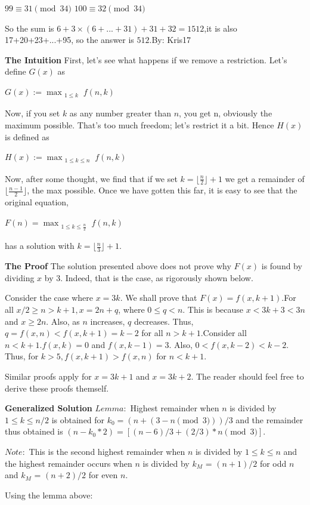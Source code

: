 \begin{enumerate}
 $99\equiv 31 \pmod{34}$
$100\equiv 32 \pmod{34}$

 So the sum is $6+3\times(6+...+31)+31+32=1512$,it is also 17+20+23+...+95, so the answer is $\boxed{512}$.By: Kris17

 \textbf{The Intuition} First, let's see what happens if we remove a restriction. Let's define $G(x)$ as

 $G(x):=\max_{\substack{1\le k}} f(n, k)$

 Now, if you set $k$ as any number greater than $n$, you get n, obviously the maximum possible. That's too much freedom; let's restrict it a bit. Hence $H(x)$ is defined as

 $H(x):=\max_{\substack{1\le k\le n}} f(n, k)$

 Now, after some thought, we find that if we set $k=\lfloor \frac{n}{2} \rfloor+1$ we get a remainder of $\lfloor \frac{n-1}{2} \rfloor$, the max possible. Once we have gotten this far, it is easy to see that the original equation, 

 $F(n) = \max_{\substack{1\le k\le \frac{n}{2}}} f(n, k)$

 has a solution with $k=\lfloor \frac{n}{3} \rfloor+1$.

 \textbf{The Proof} The solution presented above does not prove why $F(x)$ is found by dividing $x$ by $3$. Indeed, that is the case, as rigorously shown below.

 Consider the case where $x = 3k$. We shall prove that $F(x) = f(x, k+1)$.For all $x/2\ge n > k+1, x = 2n + q$, where $0\le q< n$. This is because $x < 3k + 3 < 3n$ and $x \ge 2n$. Also, as $n$ increases, $q$ decreases. Thus, $q = f(x, n) < f(x, k+1) = k - 2$ for all $n > k+1$.Consider all $n < k+1. f(x, k) = 0$ and $f(x, k-1) = 3$. Also, $0 < f(x, k-2) < k-2$. Thus, for $k > 5, f(x, k+1) > f(x, n)$ for $n < k+1$.

 Similar proofs apply for $x = 3k + 1$ and $x = 3k + 2$. The reader should feel free to derive these proofs themself.

 \textbf{Generalized Solution} $Lemma:$ Highest remainder when $n$ is divided by $1\leq k\leq n/2$ is obtained for $k_0 = (n + (3 - n \pmod{3}))/3$ and the remainder thus obtained is $(n - k_0*2) = [(n - 6)/3 + (2/3)*n \pmod{3}]$. 

 $Note:$ This is the second highest remainder when $n$ is divided by $1\leq k\leq n$ and the highest remainder occurs when $n$ is divided by $k_M$ = $(n+1)/2$ for odd $n$ and  $k_M$ = $(n+2)/2$ for even $n$.

 Using the lemma above:


\end{enumerate}
